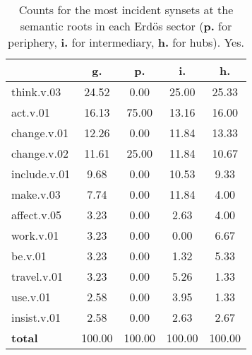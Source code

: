 \begin{table}[h!]
\begin{center}
\begin{tabular}{| l || c | c | c | c |}\hline
 & {\bf g.} & {\bf p.} & {\bf i.} & {\bf h.} \\\hline\hline
think.v.03 & 24.52  & 0.00  & 25.00  & 25.33 \\\hline
act.v.01 & 16.13  & 75.00  & 13.16  & 16.00 \\\hline
change.v.01 & 12.26  & 0.00  & 11.84  & 13.33 \\\hline
change.v.02 & 11.61  & 25.00  & 11.84  & 10.67 \\\hline
include.v.01 & 9.68  & 0.00  & 10.53  & 9.33 \\\hline
make.v.03 & 7.74  & 0.00  & 11.84  & 4.00 \\\hline
affect.v.05 & 3.23  & 0.00  & 2.63  & 4.00 \\\hline
work.v.01 & 3.23  & 0.00  & 0.00  & 6.67 \\\hline
be.v.01 & 3.23  & 0.00  & 1.32  & 5.33 \\\hline
travel.v.01 & 3.23  & 0.00  & 5.26  & 1.33 \\\hline
use.v.01 & 2.58  & 0.00  & 3.95  & 1.33 \\\hline
insist.v.01 & 2.58  & 0.00  & 2.63  & 2.67 \\\hline\hline
{{\bf total}} & 100.00  & 100.00  & 100.00  & 100.00 \\\hline
\end{tabular}
\caption{Counts for the most incident synsets at the semantic roots in each Erd\"os sector ({\bf p.} for periphery, {\bf i.} for intermediary, {\bf h.} for hubs). Yes.}
\end{center}
\end{table}
